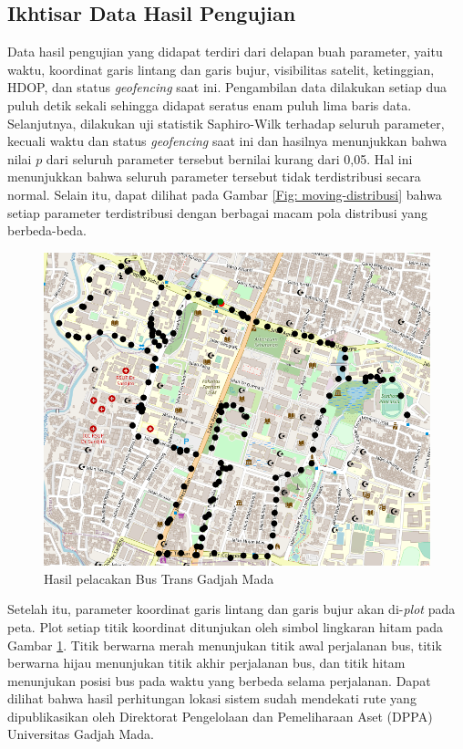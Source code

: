 \subsection{Ikhtisar Data Hasil Pengujian}
Data hasil pengujian yang didapat terdiri dari delapan buah parameter, yaitu waktu, koordinat garis lintang dan garis bujur, visibilitas satelit, ketinggian, HDOP, dan status \textit{geofencing} saat ini. Pengambilan data dilakukan setiap dua puluh detik sekali sehingga didapat seratus enam puluh lima baris data. Selanjutnya, dilakukan uji statistik Saphiro-Wilk terhadap seluruh parameter, kecuali waktu dan status \textit{geofencing} saat ini dan hasilnya menunjukkan bahwa nilai $p$ dari seluruh parameter tersebut bernilai kurang dari 0,05. Hal ini menunjukkan bahwa seluruh parameter tersebut tidak terdistribusi secara normal. Selain itu, dapat dilihat pada Gambar \ref{Fig: moving-distribusi} bahwa setiap parameter terdistribusi dengan berbagai macam pola distribusi yang berbeda-beda.

\begin{figure}[H]
	\centering
	\includegraphics[width=12cm]{contents/chapter-4/pengujian-bergerak/tracked-route.png}
	\caption{Hasil pelacakan Bus Trans Gadjah Mada}
	\label{Fig: moving-tracked-route}
\end{figure}

Setelah itu, parameter koordinat garis lintang dan garis bujur akan di-\textit{plot} pada peta. Plot setiap titik koordinat ditunjukan oleh simbol lingkaran hitam pada Gambar \ref{Fig: moving-tracked-route}. Titik berwarna merah menunjukan titik awal perjalanan bus, titik berwarna hijau menunjukan titik akhir perjalanan bus, dan titik hitam menunjukan posisi bus pada waktu yang berbeda selama perjalanan. Dapat dilihat bahwa hasil perhitungan lokasi sistem sudah mendekati rute yang dipublikasikan oleh Direktorat Pengelolaan dan Pemeliharaan Aset (DPPA) Universitas Gadjah Mada.


